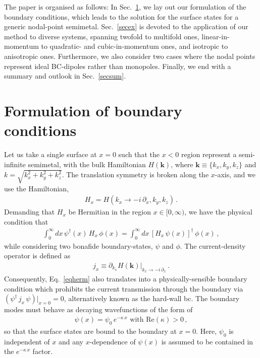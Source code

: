 \documentclass[aps,prb,onecolumn, footinbib, 10pt]{revtex4-2}
\begin{document}
The paper is organised as follows: In Sec.~\ref{secbc}, we lay out our formulation of the boundary conditions, which leads to the solution for the surface states for a generic nodal-point semimetal. Sec.~\ref{secex} is devoted to the application of our method to diverse systems, spanning twofold to multifold ones, linear-in-momentum to quadratic- and cubic-in-momentum ones, and isotropic to anisotropic ones. Furthermore, we also consider two cases where the nodal points represent ideal BC-dipoles rather than monopoles. Finally, we end with a summary and outlook in Sec.~\ref{secsum}.


\section{Formulation of boundary conditions}
\label{secbc}

Let us take a single surface at $x=0$ such that the $x<0$ region represent a semi-infinite semimetal, with the bulk Hamiltonian $H(\mathbf k)$, where $\mathbf k \equiv \lbrace k_x, k_y, k_z \rbrace $ and $k =\sqrt{k_x^2 + k_y^2 + k_z^2}$. The translation symmetry is broken along the $x$-axis, and we use the Hamiltonian,
\begin{align}
H_x = H (k_x \rightarrow -i \, \partial_x , k_y, k_z)\,.
\end{align}
Demanding that $H_x $ be Hermitian in the region $x \in [0, \infty)$, we have the physical condition that
\begin{align}
\label{eqherm}
 \int_0^\infty  dx \,\psi^\dagger (x) \, H_x\,\phi (x) = 
 \int_0^\infty  dx\, [H_x\, \psi(x) ]^\dagger\,\phi(x) \,,
\end{align}
while considering two bonafide boundary-states, $\psi $ and $\phi$. The current-density operator is defined as
\begin{align}
j_x \equiv \partial_{k_x}  H(\mathbf k) \vert_{k_x \rightarrow -i\, \partial_x}\,.
\end{align}
Consequently, Eq.~\eqref{eqherm} also translates into a physically-sensible boundary condition which prohibits the current transmission through the boundary via $ (\psi^\dagger \, j_x \, \psi )\vert_{x=0}= 0$, alternatively known as the hard-wall bc. The boundary modes must behave as decaying wavefunctions of the form of
\begin{align}
\psi (x) = \psi_0 \, e^{- \kappa \, x} \text{ with } \text{Re}(\kappa) > 0\,,
\end{align}
so that the surface states are bound to the boundary at $ x= 0 $. Here, $\psi_0$ is independent of $x$ and any $x$-dependence of $\psi(x)$ is assumed to be contained in the $ e^{- \kappa \, x}$ factor. 
\end{document}
